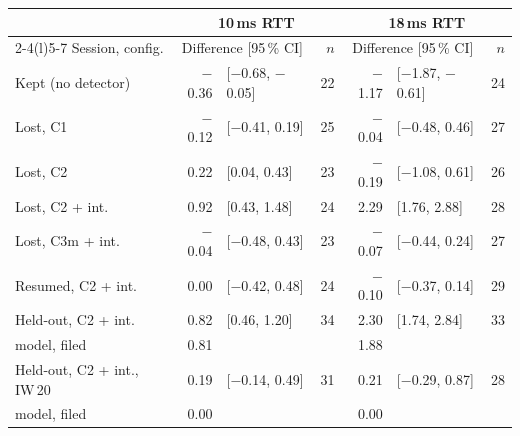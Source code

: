 \begin{tabular}{@{}lr@{\,}lrr@{\,}lr@{}}\toprule
 & \multicolumn{3}{c}{10\,ms RTT} & \multicolumn{3}{c}{18\,ms RTT} \\ \cmidrule(lr){2-4}\cmidrule(l){5-7}
Session, config. & \multicolumn{2}{c}{Difference [95\,\% CI]} & $n$ & \multicolumn{2}{c}{Difference [95\,\% CI]} & $n$ \\ \midrule
Kept (no detector) & $-$0.36 & [$-$0.68, $-$0.05] & 22 & $-$1.17 & [$-$1.87, $-$0.61] & 24 \\
Lost, C1 & $-$0.12 & [$-$0.41, 0.19] & 25 & $-$0.04 & [$-$0.48, 0.46] & 27 \\
Lost, C2 & 0.22 & [0.04, 0.43] & 23 & $-$0.19 & [$-$1.08, 0.61] & 26 \\
Lost, C2 + int. & 0.92 & [0.43, 1.48] & 24 & 2.29 & [1.76, 2.88] & 28 \\
Lost, C3m + int. & $-$0.04 & [$-$0.48, 0.43] & 23 & $-$0.07 & [$-$0.44, 0.24] & 27 \\
Resumed, C2 + int. & 0.00 & [$-$0.42, 0.48] & 24 & $-$0.10 & [$-$0.37, 0.14] & 29 \\
\midrule
Held-out, C2 + int. & 0.82 & [0.46, 1.20] & 34 & 2.30 & [1.74, 2.84] & 33 \\
\quad model, filed & 0.81 & &  & 1.88 & &  \\
Held-out, C2 + int., IW\,20 & 0.19 & [$-$0.14, 0.49] & 31 & 0.21 & [$-$0.29, 0.87] & 28 \\
\quad model, filed & 0.00 & &  & 0.00 & &  \\
\bottomrule\end{tabular}

